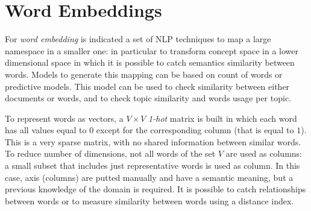 \documentclass[11pt, a4page]{article}
\begin{document}
\section{Word Embeddings}
For \textit{word embedding} is indicated a set of NLP techniques to map a large namespace in a smaller one: in particular to transform concept space in a lower dimensional space in which it is possible to catch semantics similarity between words.
Models to generate this mapping can be based on count of words or predictive models.
This model can be used to check similarity between either documents or words, and to check topic similarity and words usage per topic.

To represent words as vectors, a $V \times V$ \textit{1-hot} matrix is built in which each word has all values equal to $0$ except for the corresponding column (that is equal to $1$).
This is a very sparse matrix, with no shared information between similar words.
To reduce number of dimensions, not all words of the set $V$ are used as columns: a small subset that includes just representative words is used as column.
In this case, axis (columns) are putted manually and have a semantic meaning, but a previous knowledge of the domain is required.
It is possible to catch relationships between words or to measure similarity between words using a distance index.
\end{document}

